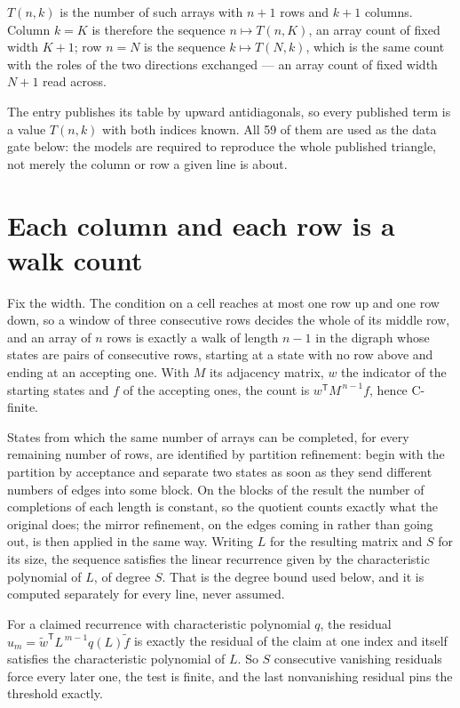 \documentclass[11pt]{article}
\theoremstyle{definition}
\begin{document}
$T(n,k)$ is the number of such arrays with $n + 1$ rows and $k + 1$ columns. Column $k = K$ is therefore the sequence $n \mapsto T(n,K)$, an array count of fixed width $K + 1$; row $n = N$ is the sequence $k \mapsto T(N,k)$, which is the same count with the roles of the two directions exchanged --- an array count of fixed width $N + 1$ read across.

The entry publishes its table by upward antidiagonals, so every published term is a value $T(n,k)$ with both indices known. All 59 of them are used as the data gate below: the models are required to reproduce the whole published triangle, not merely the column or row a given line is about.

\section{Each column and each row is a walk count}

Fix the width. The condition on a cell reaches at most one row up and one row down, so a window of three consecutive rows decides the whole of its middle row, and an array of $n$ rows is exactly a walk of length $n-1$ in the digraph whose states are pairs of consecutive rows, starting at a state with no row above and ending at an accepting one. With $M$ its adjacency matrix, $w$ the indicator of the starting states and $f$ of the accepting ones, the count is $w^{\mathsf T}M^{\,n-1}f$, hence C-finite.

States from which the same number of arrays can be completed, for every remaining number of rows, are identified by partition refinement: begin with the partition by acceptance and separate two states as soon as they send different numbers of edges into some block. On the blocks of the result the number of completions of each length is constant, so the quotient counts exactly what the original does; the mirror refinement, on the edges coming in rather than going out, is then applied in the same way. Writing $L$ for the resulting matrix and $S$ for its size, the sequence satisfies the linear recurrence given by the characteristic polynomial of $L$, of degree $S$. That is the degree bound used below, and it is computed separately for every line, never assumed.

For a claimed recurrence with characteristic polynomial $q$, the residual $u_m = \tilde w^{\mathsf T}L^{\,m-1}q(L)\tilde f$ is exactly the residual of the claim at one index and itself satisfies the characteristic polynomial of $L$. So $S$ consecutive vanishing residuals force every later one, the test is finite, and the last nonvanishing residual pins the threshold exactly.
\end{document}
